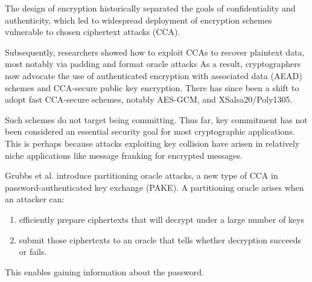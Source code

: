 The design of encryption historically separated the goals of confidentiality and authenticity, which led to widespread
deployment of encryption schemes vulnerable to chosen ciphertext attacks (CCA).

Subsequently, researchers showed how to exploit CCAs to recover plaintext data, most notably via padding and
format oracle attacks
As a result, cryptographers now advocate the use of authenticated encryption with associated data (AEAD) schemes and CCA-secure
public key encryption.
There has since been a shift to adopt fast CCA-secure schemes, notably AES-GCM, and XSalsa20/Poly1305.

Such schemes do not target being committing.
Thus far, key commitment has not been considered an essential security goal for most cryptographic applications.
This is perhaps because attacks exploiting key collision have arisen in relatively niche applications like
message franking for encrypted messages.

Grubbs et al. introduce partitioning oracle attacks, a new type of CCA in password-authenticated key exchange (PAKE).
A partitioning oracle arises when an attacker can:
\begin{enumerate}
    \item efficiently prepare ciphertexts that will decrypt under a large number of keys
    \item submit those ciphertexts to an oracle that tells whether decryption succeeds or fails.
\end{enumerate}

This enables gaining information about the password.